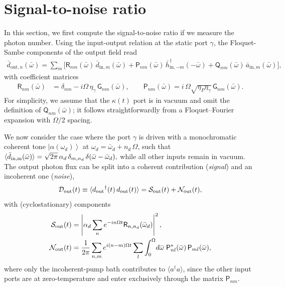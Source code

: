 \documentclass[prl,onecolumn,floatfix,10pt,superscriptaddress]{revtex4-2}
\newcommand{\ket}[1]{\ensuremath{\left|{#1}\right\rangle}}
\newcommand{\msf}[1]{\mathsf{#1}}
\newcommand{\mcl}[1]{\mathcal{#1}}
\newcommand{\msG}{{\msf{G}}}
\newcommand{\msQ}{{\msf{Q}}}
\newcommand{\msP}{{\msf{P}}}
\newcommand{\rmout}{{{\rm out}}}
\begin{document}
\section{Signal-to-noise ratio}
In this section, we first compute the signal-to-noise ratio if we measure the photon number. Using the input-output relation at the static port $\gamma$, the Floquet-Sambe components of the output field read
\begin{align}
\bar{d}_{\text{out},n}(\bar\omega) 
= \sum_m \Big[
\msf{R}_{n m}(\bar\omega)\, \bar{d}_{\text{in},m}(\bar\omega) + \msf{P}_{n m}(\bar\omega)\, \bar{h}_{\text{in},-m}^\dagger(-\bar\omega)
+ \msf{Q}_{n m}(\bar\omega)\, \bar{a}_{\text{in},m}(\bar\omega) 
\Big],
\end{align}
with coefficient matrices 
\begin{align}
\msf{R}_{n m}(\bar\omega) &= \delta_{n m} - i \Omega\,\eta_{\gamma}\,\msG_{n m}(\bar\omega),\qquad
\msP_{n m}(\bar\omega) = i\,\Omega\sqrt{\eta_{P}\eta_{\gamma}}\,\msf{G}_{n m}(\bar\omega).
\end{align}
For simplicity, we assume that the $\kappa(t)$ port is in vacuum and omit the definition of $\msQ_{nm}(\bar{\omega})$; it follows straightforwardly from a Floquet--Fourier expansion with $\Omega/2$ spacing.


We now consider the case where the port $\gamma$ is driven with a monochromatic coherent tone $\ket{\alpha(\omega_d)}$ at $\omega_d=\bar\omega_d+n_d\,\Omega$, such that 
$\langle \bar d_{\rm in,m}(\bar\omega)\rangle = \sqrt{2\pi}\,\alpha_d\,\delta_{m,n_d}\,\delta(\bar\omega-\bar\omega_d),
$ while all other inputs remain in vacuum. The output photon flux can be split into a coherent contribution (\emph{signal}) and an incoherent one (\emph{noise}),
\begin{align}
\mcl{D}_{\rmout}(t)\equiv \langle d_{\rm out}{}^\dag(t)\,d_{\rm out}(t)\rangle
=\mcl{S}_{\rm out}(t)+\mcl{N}_{\rm out}(t),
\end{align}
with (cyclostationary) components
\begin{align}
\mcl{S}_{\rmout}(t)&=\left|\alpha_d\sum_n e^{-i n \Omega t} \msf{R}_{n,n_d}(\bar\omega_d)\right|^2,\\
\mcl{N}_{\rm out}(t)&=\frac{1}{2\pi} \sum_{n,m}e^{i(n-m)\Omega t}
\sum_{l}\int_0^{\Omega}\! d\bar\omega \;
\msf{P}^*_{n l}(\bar\omega)\,\msf{P}_{m l}(\bar\omega),
\end{align}
where only the incoherent-pump bath contributes to $\langle a^\dag a\rangle$, since the other input ports are at zero-temperature and enter exclusively through the matrix $\msf{P}_{nm}$.



\end{document}
